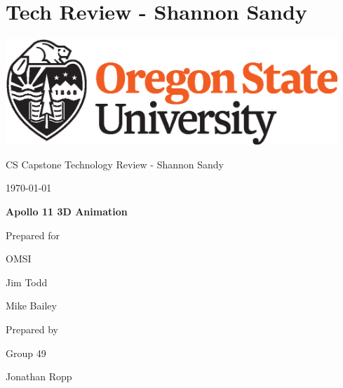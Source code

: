\documentclass[onecolumn, draftclsnofoot,10pt, compsoc]{IEEEtran}
\def \CapstoneTeamName{		    The Apolloers}
\def \CapstoneTeamNumber{		49}
\def \GroupMemberOne{			Jonathan Ropp}
\def \GroupMemberTwo{			Shannon Sandy}
\def \GroupMemberThree{			Dean Akin}
\def \CapstoneProjectName{		Apollo 11 3D Animation}
\def \CapstoneSponsorCompany{	OMSI}
\def \CapstoneSponsorPersona{	Jim Todd}
\def \CapstoneSponsorPersonb{	Mike Bailey}
\newcommand{\NameSigPair}[1]{\par
\makebox[2.75in][r]{#1} \hfil 	\makebox[3.25in]{\makebox[2.25in]{\hrulefill} \hfill		\makebox[.75in]{\hrulefill}}
\par\vspace{-12pt} \textit{\tiny\noindent
\makebox[2.75in]{} \hfil		\makebox[3.25in]{\makebox[2.25in][r]{Signature} \hfill	\makebox[.75in][r]{Date}}}}
\renewcommand{\NameSigPair}[1]{#1}
\begin{document}
\section{Tech Review - Shannon Sandy}

\begin{titlepage}
    \begin{singlespace}
        \hfill 
        \includegraphics[height=4cm]{OSU_horizontal_2C_O_over_B.eps}   
        \par\vspace{.2in}
        \centering
        \scshape{
            \huge CS Capstone Technology Review - Shannon Sandy \par
            {\large\today}\par
            \vspace{.5in}
            \textbf{\Huge\CapstoneProjectName}\par
            \vfill
            {\large Prepared for}\par
            \Huge \CapstoneSponsorCompany\par
            \vspace{5pt}
            {\Large\NameSigPair{\CapstoneSponsorPersona}\par}
            {\Large\NameSigPair{\CapstoneSponsorPersonb}\par}
            {\large Prepared by }\par
            Group\CapstoneTeamNumber\par
            \vspace{5pt}
            {\Large
                \NameSigPair{\GroupMemberOne}\par
}}
\end{singlespace}
\end{titlepage}
\end{document}
